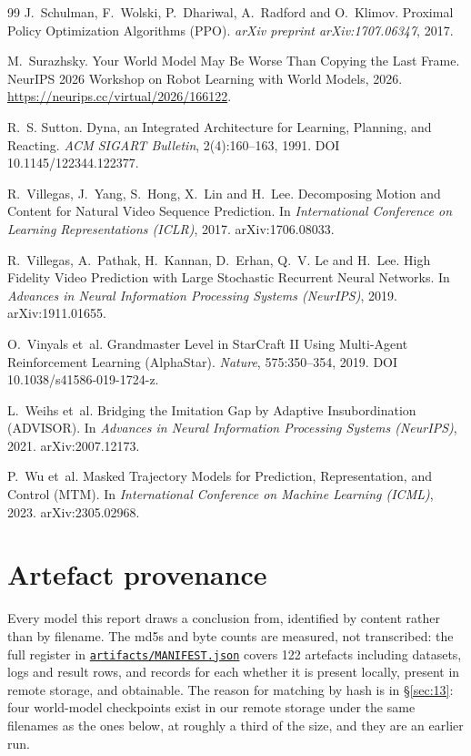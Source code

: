 \documentclass[11pt]{article}
\begin{document}
\begin{thebibliography}{99}
J.~Schulman, F.~Wolski, P.~Dhariwal, A.~Radford and O.~Klimov.
\newblock Proximal Policy Optimization Algorithms (PPO).
\newblock \emph{arXiv preprint arXiv:1707.06347}, 2017.

M.~Surazhsky.
\newblock Your World Model May Be Worse Than Copying the Last Frame.
\newblock NeurIPS 2026 Workshop on Robot Learning with World Models, 2026. \url{https://neurips.cc/virtual/2026/166122}.

R.~S. Sutton.
\newblock Dyna, an Integrated Architecture for Learning, Planning, and Reacting.
\newblock \emph{ACM SIGART Bulletin}, 2(4):160--163, 1991. DOI 10.1145/122344.122377.

R.~Villegas, J.~Yang, S.~Hong, X.~Lin and H.~Lee.
\newblock Decomposing Motion and Content for Natural Video Sequence Prediction.
\newblock In \emph{International Conference on Learning Representations (ICLR)}, 2017. arXiv:1706.08033.

R.~Villegas, A.~Pathak, H.~Kannan, D.~Erhan, Q.~V. Le and H.~Lee.
\newblock High Fidelity Video Prediction with Large Stochastic Recurrent Neural Networks.
\newblock In \emph{Advances in Neural Information Processing Systems (NeurIPS)}, 2019. arXiv:1911.01655.

O.~Vinyals et~al.
\newblock Grandmaster Level in StarCraft II Using Multi-Agent Reinforcement Learning (AlphaStar).
\newblock \emph{Nature}, 575:350--354, 2019. DOI 10.1038/s41586-019-1724-z.

L.~Weihs et~al.
\newblock Bridging the Imitation Gap by Adaptive Insubordination (ADVISOR).
\newblock In \emph{Advances in Neural Information Processing Systems (NeurIPS)}, 2021. arXiv:2007.12173.

P.~Wu et~al.
\newblock Masked Trajectory Models for Prediction, Representation, and Control (MTM).
\newblock In \emph{International Conference on Machine Learning (ICML)}, 2023. arXiv:2305.02968.

\end{thebibliography}

\appendix
\section{Artefact provenance}
\label{app:a}

Every model this report draws a conclusion from, identified by content rather than by filename. The md5s and byte counts are measured, not transcribed: the full register in \href{https://github.com/JordyKieto/ppo-hyrule/blob/main/artifacts/MANIFEST.json}{\texttt{artifacts/MANIFEST.json}} covers 122 artefacts including datasets, logs and result rows, and records for each whether it is present locally, present in remote storage, and obtainable. The reason for matching by hash is in \S\ref{sec:13}: four world-model checkpoints exist in our remote storage under the same filenames as the ones below, at roughly a third of the size, and they are an earlier run.
\end{document}
